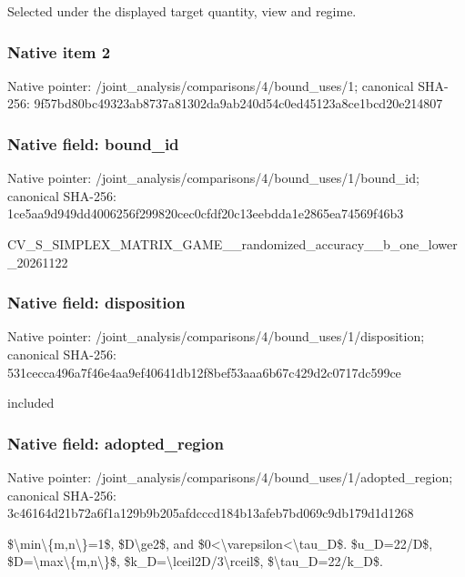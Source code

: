 \documentclass[10pt,a4paper]{article}
\begin{document}
Selected under the displayed target quantity, view and regime.


\subsubsection{Native item 2}


Native pointer: /joint\_analysis/comparis\allowbreak{}ons/4/bound\_uses/1; canonical SHA-256: 9f57bd80bc49323ab8737a81\allowbreak{}302da9ab240d54c0ed45123a\allowbreak{}8ce1bcd20e214807



\subsubsection{Native field: bound\_id}


Native pointer: /joint\_analysis/comparis\allowbreak{}ons/4/bound\_uses/1/bound\allowbreak{}\_id; canonical SHA-256: 1ce5aa9d949dd4006256f299\allowbreak{}820cec0cfdf20c13eebdda1e\allowbreak{}2865ea74569f46b3


CV\_S\_SIMPLEX\_MATRIX\_GAME\allowbreak{}\_\_randomized\_accuracy\_\_b\allowbreak{}\_one\_lower\_20261122


\subsubsection{Native field: disposition}


Native pointer: /joint\_analysis/comparis\allowbreak{}ons/4/bound\_uses/1/dispo\allowbreak{}sition; canonical SHA-256: 531cecca496a7f46e4aa9ef4\allowbreak{}0641db12f8bef53aaa6b67c4\allowbreak{}29d2c0717dc599ce


included


\subsubsection{Native field: adopted\_region}


Native pointer: /joint\_analysis/comparis\allowbreak{}ons/4/bound\_uses/1/adopt\allowbreak{}ed\_region; canonical SHA-256: 3c46164d21b72a6f1a129b9b\allowbreak{}205afdcccd184b13afeb7bd0\allowbreak{}69c9db179d1d1268


\$\textbackslash{}min\textbackslash{}\{m,n\textbackslash{}\}=1\$, \$D\textbackslash{}ge2\$, and \$0<\textbackslash{}varepsilon<\textbackslash{}tau\_D\$. \$u\_D=22/D\$, \$D=\textbackslash{}max\textbackslash{}\{m,n\textbackslash{}\}\$, \$k\_D=\textbackslash{}lceil2D/3\textbackslash{}rceil\$, \$\textbackslash{}tau\_D=22/k\_D\$.
\end{document}
